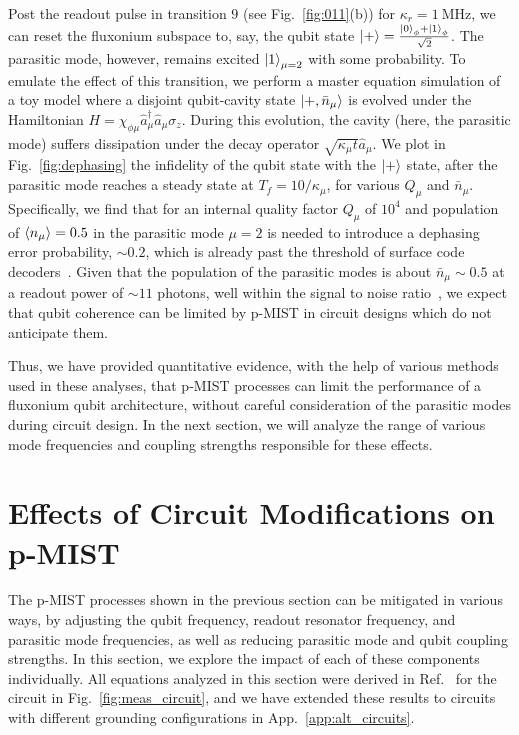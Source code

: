 \documentclass[%
reprint,
superscriptaddress,
 amsmath,amssymb,
 aps,
 prx,
longbibliography,
floatfix,
]{revtex4-2}
\begin{document}
Post the readout pulse in transition $9$ (see Fig.~\ref{fig:011}(b)) for $\kappa_r=1 \ \mathrm{MHz}$, we can reset the fluxonium subspace to, say, the qubit state $\ket{+}=\frac{\ket{0}_\phi+\ket{1}_\phi}{\sqrt{2}}$. The parasitic mode, however, remains excited $\ket{1}_{\mu=2}$ with some probability.
To emulate the effect of this transition, we perform a master equation simulation of a toy model where a disjoint qubit-cavity state $\ket{+,\bar n_\mu}$ is evolved under the Hamiltonian $H=\chi_{\phi\mu} \hat a_\mu^\dagger \hat a_\mu \sigma_z$. During this evolution, the cavity (here, the parasitic mode) suffers dissipation under the decay operator $\sqrt{\kappa_\mu t}\hat a_\mu$. We plot in Fig.~\ref{fig:dephasing} the infidelity of the qubit state with the $\ket{+}$ state, after the parasitic mode reaches a steady state at $T_f=10/\kappa_\mu$, for various $Q_\mu$ and $\bar n_\mu$. Specifically, we find that for an internal quality factor $Q_\mu$ of $10^{4}$ and population of $\braket{n_\mu}=0.5$ in the parasitic mode $\mu=2$ is needed to introduce a dephasing error probability, $\sim 0.2$, which is already past the threshold of surface code decoders~\cite{fowler2012surface}. Given that the population of the parasitic modes is about $\bar n_\mu\sim 0.5$ at a readout power of $\sim 11$ photons, well within the signal to noise ratio~\cite{gusenkova2021quantum}, we expect that qubit coherence can be limited by p-MIST in circuit designs which do not anticipate them.

Thus, we have provided quantitative evidence, with the help of various methods used in these analyses, that p-MIST processes can limit the performance of a fluxonium qubit architecture, without careful consideration of the parasitic modes during circuit design. In the next section, we will analyze the range of various mode frequencies and coupling strengths responsible for these effects.

\section{Effects of Circuit Modifications on p-MIST}\label{sec:expressions}
The p-MIST processes shown in the previous section can be mitigated in various ways, by adjusting the qubit frequency, readout resonator frequency, and parasitic mode frequencies, as well as reducing parasitic mode and qubit coupling strengths. In this section, we explore the impact of each of these components individually. All equations analyzed in this section were derived in Ref.~\cite{viola2015collective} for the circuit in Fig.~\ref{fig:meas_circuit}, and we have extended these results to circuits with different grounding configurations in App.~\ref{app:alt_circuits}.
\end{document}
